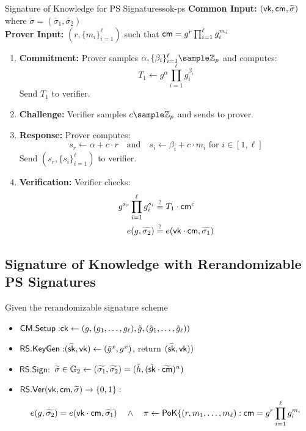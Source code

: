 \begin{protocol}{Signature of Knowledge for PS Signatures}{sok-ps}
\textbf{Common Input:} $(\mathsf{vk}, \mathsf{cm}, \widetilde{\sigma})$ where $\widetilde{\sigma} = (\widetilde{\sigma_1}, \widetilde{\sigma_2})$\\
\textbf{Prover Input:} $(r, \{m_i\}_{i=1}^\ell)$ such that $\mathsf{cm} = g^r \prod_{i=1}^\ell g_i^{m_i}$

\begin{enumerate}
    \item \textbf{Commitment:} Prover samples $\alpha, \{\beta_i\}_{i=1}^\ell \sample \Z_p$ and computes:
    \[
        T_1 \gets g^\alpha \prod_{i=1}^\ell g_i^{\beta_i}
    \]
    Send $T_1$ to verifier.
    
    \item \textbf{Challenge:} Verifier samples $c \sample \Z_p$ and sends to prover.
    
    \item \textbf{Response:} Prover computes:
    \[
        s_r \gets \alpha + c \cdot r \quad \text{and} \quad s_i \gets \beta_i + c \cdot m_i \text{ for } i \in [1,\ell]
    \]
    Send $(s_r, \{s_i\}_{i=1}^\ell)$ to verifier.
    
    \item \textbf{Verification:} Verifier checks:
    \begin{align*}
        g^{s_r}\prod_{i=1}^\ell g_i^{s_i} &\stackrel{?}{=} T_1 \cdot \mathsf{cm}^c\\
        e(g, \widetilde{\sigma_2}) &\stackrel{?}{=} e(\mathsf{vk} \cdot \mathsf{cm}, \widetilde{\sigma_1})
    \end{align*}
\end{enumerate}
\end{protocol}



\subsection{Signature of Knowledge with Rerandomizable PS Signatures}\label{pok-ps}
Given the rerandomizable signature scheme
\begin{itemize}
    \item $\mathsf{CM.Setup:} \mathsf{ck} \gets (g, (g_1,\ldots,g_\ell), \tilde{g}, (\tilde{g}_1,\ldots,\tilde{g}_\ell))$

    \item $\mathsf{RS.KeyGen:} (\widetilde{\mathsf{sk}}, \mathsf{vk}) \gets (\tilde{g}^x, g^x)$, return $(\widetilde{\mathsf{sk}}, \mathsf{vk}))$
    
    \item $\mathsf{RS.Sign:}$ $\widetilde{\sigma} \in \mathbb{G}_2 \gets (\widetilde{\sigma_1}, \widetilde{\sigma_2}) = (\tilde{h}, (\tilde{\mathsf{sk}} \cdot \widetilde{\mathsf{cm}})^u)$
    
    \item $\mathsf{RS.Ver}(\mathsf{vk}, \mathsf{cm}, \widetilde{\sigma}) \to \{0,1\}:$ 
    \[
    e(g, \widetilde{\sigma_2}) = e(\mathsf{vk} \cdot \mathsf{cm},\widetilde{\sigma_1}) \quad \wedge \quad \pi \gets \mathsf{PoK}\{(r , m_1,\ldots,m_\ell): \mathsf{cm} = g^r \prod_{i=1}^\ell g_i^{m_i}
    \]
\end{itemize}

